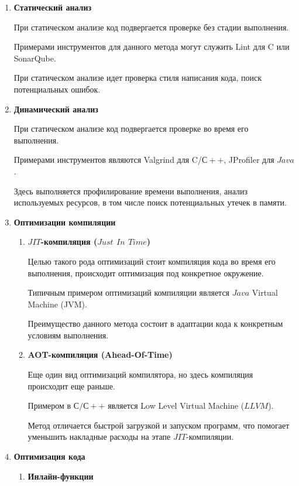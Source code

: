 \documentclass{mipt-thesis-bs}
\begin{document}
\begin{enumerate}
\item \textbf{Статический анализ}

При статическом анализе код подвергается проверке без стадии выполнения.

Примерами инструментов для данного метода могут служить Lint для C или SonarQube.

При статическом анализе идет проверка стиля написания кода, поиск потенциальных ошибок.

\item \textbf{Динамический анализ}

При статическом анализе код подвергается проверке во время его выполнения.

Примерами инструментов являются Valgrind для C/$С++$, JProfiler для $Java$.

Здесь выполняется профилирование времени выполнения, анализ используемых ресурсов, в том числе
поиск потенциальных утечек в памяти.

\item \textbf{Оптимизации компиляции}
    \begin{enumerate}
        \item \textbf{$JIT$-компиляция ($Just$ $In$ $Time$)}

        Целью такого рода оптимизаций стоит компиляция кода во время его выполнения, происходит
        оптимизация под конкретное окружение.

        Типичным примером оптимизаций компиляции является $Java$ Virtual Machine (JVM).

        Преимущество данного метода состоит в адаптации кода к конкретным условиям выполнения.

        \item \textbf{AOT-компиляция (Ahead-Of-Time)}

        Еще один вид оптимизаций компилятора, но здесь компиляция происходит еще раньше.

        Примером в $С/С++$ является Low Level Virtual Machine ($LLVM$).

        Метод отличается быстрой загрузкой и запуском программ, что помогает уменьшить накладные
        расходы на этапе $JIT$-компиляции.
    \end{enumerate}

\item \textbf{Оптимизация кода}
    \begin{enumerate}
        \item \textbf{Инлайн-функции}


\end{enumerate}
\end{enumerate}
\end{document}
